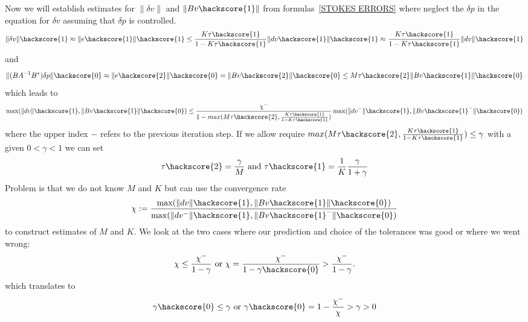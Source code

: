 Now we will establish estimates for $\|\delta v\|$ and $\|Bv\hackscore{1}\|$ from
formulas~\ref{STOKES ERRORS} where neglect the $\delta p$ in the equation for $\delta v$ assuming that 
$\delta p$ is controlled.
\begin{equation}
\|\delta v\|\hackscore{1} \approx \|e\hackscore{1}\|\hackscore{1} \le \frac{K \tau\hackscore{1}}{1-K \tau\hackscore{1}}  \| dv\hackscore{1} \|\hackscore{1} \approx \frac{K \tau\hackscore{1}}{1-K \tau\hackscore{1}} \| dv\|\hackscore{1}
\end{equation}
and  
\begin{equation}
\|(B A^{-1} B^{*}) \delta p\|\hackscore{0}  \approx \| e\hackscore{2} \|\hackscore{0}
= \| B v\hackscore{2} \|\hackscore{0} \le M \tau\hackscore{2} \| B v\hackscore{1} \|\hackscore{0}
\end{equation}
which leads to 
\begin{equation} 
\max(\|dv\|\hackscore{1}, \|Bv\hackscore{1}\|\hackscore{0})
\le \frac{\chi^{-}}{1-max{(M \tau\hackscore{2}, \frac{K \tau\hackscore{1}}{1-K \tau\hackscore{1}})}} \max(\|dv^{-}\|\hackscore{1}, \|Bv\hackscore{1}^{-}\|\hackscore{0}) \label{STOKES ESTIMTED IMPROVEMENT}
\end{equation}
where the upper index $-$ refers to the previous iteration step.
If we allow require $max{(M \tau\hackscore{2}, \frac{K \tau\hackscore{1}}{1-K \tau\hackscore{1}})}\le \gamma$ 
with a given $0<\gamma<1$ we can set
\begin{equation} \label{STOKES SET TOL}
\tau\hackscore{2} = \frac{\gamma}{M} \mbox{ and } \tau\hackscore{1} = \frac{1}{K} \frac{\gamma}{1+\gamma}
\end{equation}
Problem is that we do not know $M$ and $K$ but can use the convergence rate 
\begin{equation} 
 \chi := \frac{\max(\|dv\|\hackscore{1}, \|Bv\hackscore{1}\|\hackscore{0})}{\max(\|dv^{-}\|\hackscore{1}, \|Bv\hackscore{1}^{-}\|\hackscore{0})}
\end{equation}
to construct estimates of $M$ and $K$. We look at the two cases where our prediction and choice of 
the tolerances was good or where we went wrong:
\begin{equation} 
\chi \le \frac{\chi^{-}}{1-\gamma} \mbox{ or } 
\chi = \frac{\chi^{-}}{1-\gamma\hackscore{0}} >\frac{\chi^{-}}{1-\gamma}.
\end{equation}
which translates to 
\begin{equation} 
\gamma\hackscore{0} \le \gamma \mbox{ or } \gamma\hackscore{0}=1-\frac{\chi^{-}}{ \chi}>\gamma>0
\end{equation}
